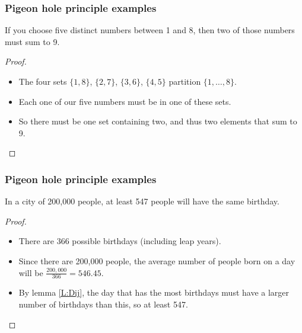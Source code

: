 \documentclass[handout]{beamer}
\begin{document}
\begin{frame}
\frametitle{Pigeon hole principle examples}
\begin{example}
If you choose five distinct numbers between 1 and 8, then two of those numbers must sum to 9.
\end{example}
\begin{proof}
\begin{itemize}
\item The four sets $\{1,8\}$, $\{2,7\}$, $\{3,6\}$, $\{4,5\}$ partition $\{1,\ldots,8\}$. \vspace{0.1cm}
\item Each one of our five numbers must be in one of these sets. \vspace{0.3cm}
\item So there must be one set containing two, and thus two elements that sum to 9.
\end{itemize}
\end{proof}
\end{frame}

\begin{frame}
\frametitle{Pigeon hole principle examples}
\begin{example}
In a city of 200,000 people, at least 547 people will have the same birthday. 
\end{example}
\begin{proof}
\begin{itemize}
\item There are 366 possible birthdays (including leap years). \vspace{0.3cm}
\item Since there are 200,000 people, the average number of people born on a day will be $\frac{200,000}{366}= 546.45$. \vspace{0.3cm}
\item By lemma \ref{L:Dij}, the day that has the most birthdays must have a larger number of birthdays than this, so at least 547.
\end{itemize}
\end{proof}
\end{frame}
\end{document}
